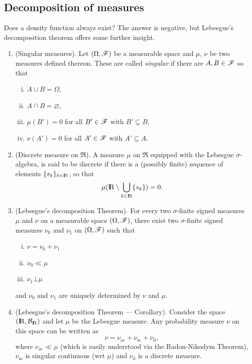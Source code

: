 \documentclass[a4paper,10pt]{article}
\begin{document}
\subsection{Decomposition of measures}
Does a density function always exist? The answer is negative, but Lebesgue's decomposition 
theorem offers some further insight. 
\begin{enumerate}
 \item (Singular measures). Let $(\Omega, \mathscr{F})$ be a measurable space and $\mu$, $\nu$
       be two measures defined thereon. These are called \textit{singular} if there are 
       $A,B\in\mathscr{F}$ so that
       \begin{enumerate}[i.]
        \item $A\cup B=\Omega$, 
        \item $A\cap B=\varnothing$,
        \item $\mu(B')=0$ for all $B'\in\mathscr{F}$ with $B'\subseteq B$,
        \item $\nu(A')=0$ for all $A'\in\mathscr{F}$ with $A'\subseteq A$.
       \end{enumerate}
 \item (Discrete measure on $\Re$). A measure $\mu$ on $\Re$ equipped with the Lebesgue $\sigma$-algebra,
       is said to be discrete if there is a (possibly finite) sequence of elements $\{s_k\}_{k\in\N}$,
       so that 
       \[
        \mu(\Re\setminus \bigcup_{k\in\N} \{s_k\}) = 0.
       \]
 \item (Lebesgue's decomposition Theorem). For every two $\sigma$-finite signed measures $\mu$ and $\nu$
       on a measurable space $(\Omega, \mathscr{F})$, there exist two $\sigma$-finite signed measures $\nu_0$ and $\nu_1$ 
       on $(\Omega, \mathscr{F})$ such that
       \begin{enumerate}[i.]
        \item $\nu = \nu_0 + \nu_1$
        \item $\nu_0\ll \mu$
        \item $\nu_1 {}\bot{} \mu$
       \end{enumerate}
       and $\nu_0$ and $\nu_1$ are uniquely determined by $\nu$ and $\mu$.
\item (Lebesgue's decomposition Theorem --- Corollary).
      Consider the space $(\Re,\B_\Re)$ and let $\mu$ be the Lebesgue measure. Any probability measure $\nu$
      on this space can be written as
      \[
       \nu = \nu_{\text{ac}} + \nu_{\text{sc}} + \nu_{\text{d}},
      \]
      where $\nu_{\text{ac}} \ll \mu$ (which is easily understood via the 
      Radon-Nikodym Theorem), $\nu_{\text{sc}}$ is singular continuous (wrt $\mu$) and $\nu_{\text{d}}$
      is a discrete measure.
             
\end{enumerate}
\end{document}
